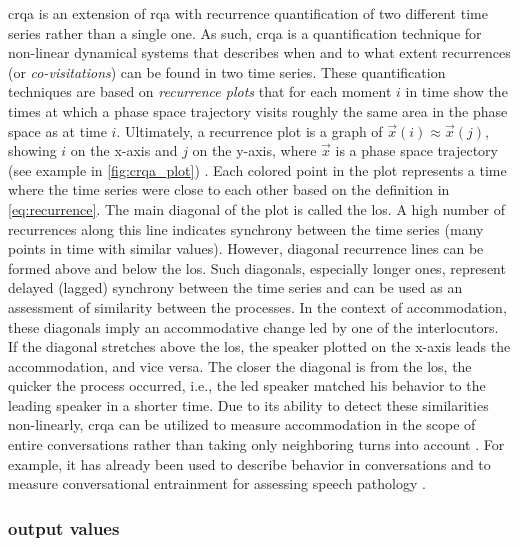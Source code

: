 \Acf{crqa} is an extension of \ac{rqa} with recurrence quantification of two different time series rather than a single one.
As such, \ac{crqa} is a quantification technique for non-linear dynamical systems that describes when and to what extent recurrences (or \emph{co-visitations}) can be found in two time series.
These quantification techniques are based on \emph{recurrence plots} that for each moment $i$ in time show the times at which a phase space trajectory visits roughly the same area in the phase space as at time $i$.
Ultimately, a recurrence plot is a graph of $\vec{x}(i) \approx \vec{x}(j)$, showing $i$ on the x-axis and $j$ on the y-axis, where $\vec{x}$ is a phase space trajectory (see example in \cref{fig:crqa_plot})
.
Each colored point in the plot represents a time where the time series were close to each other based on the definition in \cref{eq:recurrence}.
The main diagonal of the plot is called the \acf{los}.
A high number of recurrences along this line indicates synchrony between the time series (many points in time with similar values).
However, diagonal recurrence lines can be formed above and below the \ac{los}.
Such diagonals, especially longer ones, represent delayed (lagged) synchrony between the time series and can be used as an assessment of similarity between the processes.
In the context of accommodation, these diagonals imply an accommodative change led by one of the interlocutors.
If the diagonal stretches above the \ac{los}, the speaker plotted on the x-axis leads the accommodation, and vice versa.
The closer the diagonal is from the \ac{los}, the quicker the process occurred, i.e., the led speaker matched his behavior to the leading speaker in a shorter time.
Due to its ability to detect these similarities non-linearly, \ac{crqa} can be utilized to measure accommodation in the scope of entire conversations rather than taking only neighboring turns into account \citep[cf.][]{Levitan2013entrainment}.
For example, it has already been used to describe behavior in conversations \citep{Duran2017conversing} and to measure conversational entrainment for assessing speech pathology \citep{Borrie2019syncing}.

\subsubsection{output values}
\label{subsubsec:output_values}

